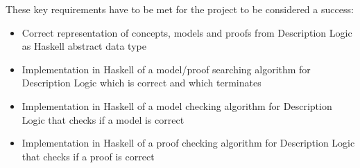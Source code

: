 These key requirements have to be met for the project to be considered a success:

\begin{itemize}
\item Correct representation of concepts, models and proofs from Description Logic as Haskell abstract data type
\item Implementation in Haskell of a model/proof searching algorithm for Description Logic which is correct and which terminates
\item Implementation in Haskell of a model checking algorithm for Description Logic that checks
if a model is correct
\item Implementation in Haskell of a proof checking algorithm for Description Logic that checks if a proof is correct
\end{itemize}

